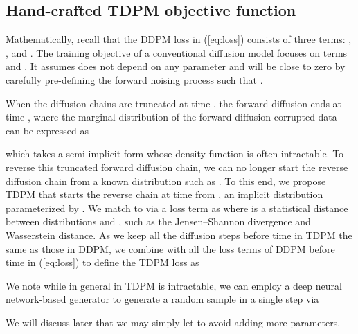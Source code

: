 \documentclass{article} \usepackage{iclr2023_conference,times}
\newcommand{\ba}[1]{}
\newcommand{\given}{\,|\,}
\def\Eqref#1{(\ref{#1})}
\def\rvx{{\mathbf{x}}}
\def\rvz{{\mathbf{z}}}
\def\vzero{{\bm{0}}}
\def\mI{{\bm{I}}}
\def\gL{{\mathcal{L}}}
\theoremstyle{plain}
\theoremstyle{definition}
\theoremstyle{remark}
\begin{document}
{\subsection{Hand-crafted TDPM objective function}
Mathematically, recall that the DDPM loss in \Eqref{eq:loss} consists of three terms: , , and . The training objective of a conventional diffusion model focuses on terms  and . It assumes  does not depend on any parameter and will be close to zero by carefully pre-defining the forward noising process such that . 

When the diffusion chains are truncated 
at time , the forward diffusion ends at time , where the marginal distribution of the forward diffusion-corrupted data can be expressed as
\ba{
q(\rvx_{T_\text{trunc}}) \coloneqq  \textstyle\int q(\rvx_{T_\text{trunc}}\given \rvx_0) p(\rvx_0) d\rvx_0, 
\label{eq:aggregated_post}
}
which takes a semi-implicit form \citep{yin2018semi} whose density function is often intractable.
To reverse this truncated forward diffusion chain, we can no longer start the reverse diffusion chain from a known distribution such as . To this end, we propose TDPM that starts the reverse chain at time   from , an implicit distribution parameterized by . 
We match  to  via a loss term as
 where  is a statistical distance between distributions  and , such as the Jensen--Shannon divergence and Wasserstein distance. As we keep all the diffusion steps before time  in TDPM the same as those in DDPM, we combine  with all the loss terms of DDPM before time  in \Eqref{eq:loss} to define the TDPM loss  as \ba{
{\gL}_{\text{TDPM}} &\coloneqq \textstyle \sum_{t=1}^{T_\text{trunc}}\gL_{t-1}(\theta) + \tilde\gL_{T_\text{trunc}}(\psi), ~~ \tilde{\gL}_{T_\text{trunc}}(\psi) \coloneqq \mathcal{D}\left(q(\rvx_{T_\text{trunc}})||p_{\psi}(\rvx_{T_\text{trunc}} )\right),\label{eq:Elbo_tilde}
}


We note while in general  in TDPM is intractable, we can employ
a deep neural network-based generator  to generate a random sample in a single step via
\ba{
\rvx_{T_\text{trunc}} = G_{\psi}(\rvz),~\rvz\sim \mathcal{N}(\vzero, \mI).
}
We will discuss later that we may simply let  to avoid adding more parameters.





}
\end{document}
